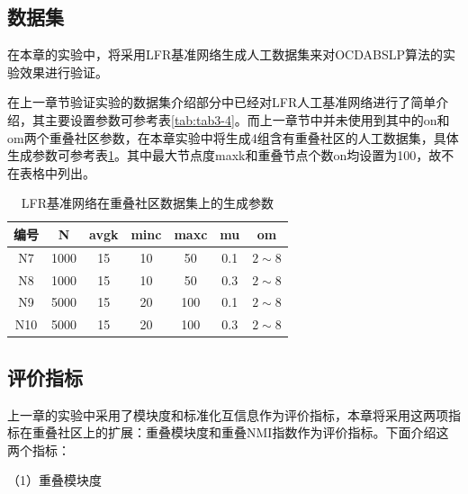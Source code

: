 \subsection{数据集}

在本章的实验中，将采用LFR基准网络生成人工数据集来对OCDABSLP算法的实验效果进行验证。

在上一章节验证实验的数据集介绍部分中已经对LFR人工基准网络进行了简单介绍，其主要设置参数可参考表\ref{tab:tab3-4}。而上一章节中并未使用到其中的on和om两个重叠社区参数，在本章实验中将生成4组含有重叠社区的人工数据集，具体生成参数可参考表\ref{tab:tab4-1}。其中最大节点度maxk和重叠节点个数on均设置为100，故不在表格中列出。


\begin{table}
  \centering
  \caption{LFR基准网络在重叠社区数据集上的生成参数} \label{tab:tab4-1}
  \begin{tabular*}{0.9\textwidth}{@{\extracolsep{\fill}}ccccccc}
  \toprule
    编号		&N  &avgk  &minc &maxc &mu  &om\\
  \midrule
    N7	&1000  &15  &10 &50 &0.1  &$2\sim 8$\\
    N8 &1000  &15  &10 &50 &0.3  &$2\sim 8$\\
    N9 &5000  &15  &20 &100 &0.1  &$2\sim 8$\\
    N10 &5000  &15  &20 &100 &0.3  &$2\sim 8$\\
  \bottomrule
  \end{tabular*}
\end{table}

\subsection{评价指标}

上一章的实验中采用了模块度和标准化互信息作为评价指标，本章将采用这两项指标在重叠社区上的扩展：重叠模块度和重叠NMI指数作为评价指标。下面介绍这两个指标：

（1）重叠模块度


